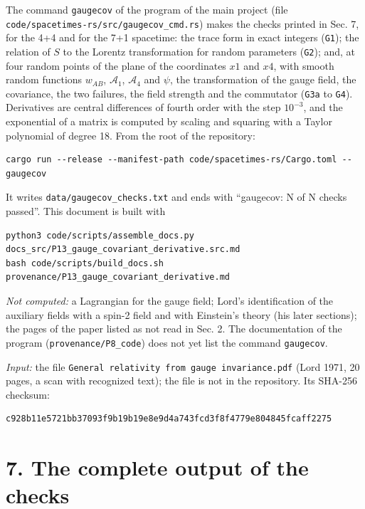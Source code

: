 \documentclass[
  10pt,
]{article}
\begin{document}
The command \texttt{gaugecov} of the program of the main project (file
\texttt{code/spacetimes-rs/src/gaugecov\_cmd.rs}) makes the checks
printed in Sec. 7, for the 4+4 and for the 7+1 spacetime: the trace form
in exact integers (\texttt{G1}); the relation of \(S\) to the Lorentz
transformation for random parameters (\texttt{G2}); and, at four random
points of the plane of the coordinates \(x1\) and \(x4\), with smooth
random functions \(w_{AB}\), \(\mathcal A_1\), \(\mathcal A_4\) and
\(\psi\), the transformation of the gauge field, the covariance, the two
failures, the field strength and the commutator (\texttt{G3a} to
\texttt{G4}). Derivatives are central differences of fourth order with
the step \(10^{-3}\), and the exponential of a matrix is computed by
scaling and squaring with a Taylor polynomial of degree 18. From the
root of the repository:

\begin{verbatim}
cargo run --release --manifest-path code/spacetimes-rs/Cargo.toml -- gaugecov
\end{verbatim}

It writes \texttt{data/gaugecov\_checks.txt} and ends with ``gaugecov: N
of N checks passed''. This document is built with

\begin{verbatim}
python3 code/scripts/assemble_docs.py docs_src/P13_gauge_covariant_derivative.src.md
bash code/scripts/build_docs.sh provenance/P13_gauge_covariant_derivative.md
\end{verbatim}

\emph{Not computed:} a Lagrangian for the gauge field; Lord's
identification of the auxiliary fields with a spin-2 field and with
Einstein's theory (his later sections); the pages of the paper listed as
not read in Sec. 2. The documentation of the program
(\texttt{provenance/P8\_code}) does not yet list the command
\texttt{gaugecov}.

\emph{Input:} the file
\texttt{General\ relativity\ from\ gauge\ invariance.pdf} (Lord 1971, 20
pages, a scan with recognized text); the file is not in the repository.
Its SHA-256 checksum:

\begin{verbatim}
c928b11e5721bb37093f9b19b19e8e9d4a743fcd3f8f4779e804845fcaff2275
\end{verbatim}

\hypertarget{the-complete-output-of-the-checks}{%
\section{7. The complete output of the
checks}\label{the-complete-output-of-the-checks}}
\end{document}
